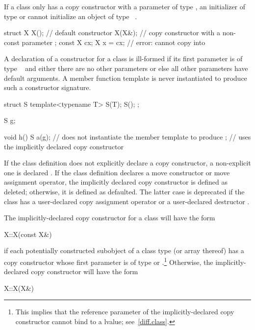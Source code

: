 \pnum
\begin{note}
If a class
only has a copy constructor with a parameter of type
,
an initializer of type
or
cannot initialize an object of type
\cv{}~.
\begin{example}
\begin{codeblock}
struct X {
  X();              // default constructor
  X(X&);            // copy constructor with a non-const parameter
};
const X cx;
X x = cx;           // error:  cannot copy  into 
\end{codeblock}
\end{example}
\end{note}

\pnum
A declaration of a constructor for a class
is ill-formed if its first parameter is of type
\cv{}~
and either there are no other parameters or else all other parameters have
default arguments.
A member function template is never instantiated to
produce such a constructor signature.
\begin{example}
\begin{codeblock}
struct S {
  template<typename T> S(T);
  S();
};

S g;

void h() {
  S a(g);           // does not instantiate the member template to produce ;
                    // uses the implicitly declared copy constructor
}
\end{codeblock}
\end{example}

\pnum
If the class definition does not explicitly declare a copy constructor,
a non-explicit one is declared .
If the class definition declares a move
constructor or move assignment operator, the implicitly declared copy
constructor is defined as deleted; otherwise, it is defined as
defaulted.
The latter case is deprecated if the class has a user-declared copy assignment
operator or a user-declared destructor .

\pnum
The implicitly-declared copy constructor for a class
will have the form
\begin{codeblock}
X::X(const X&)
\end{codeblock}
if each potentially constructed subobject of a class type
(or array thereof)
has a copy constructor whose first parameter is of type
or
.\footnote{This implies that the reference parameter of the
implicitly-declared copy constructor
cannot bind to a
lvalue; see~\ref{diff.class}.}
Otherwise, the implicitly-declared copy constructor will have the form
\begin{codeblock}
X::X(X&)
\end{codeblock}

